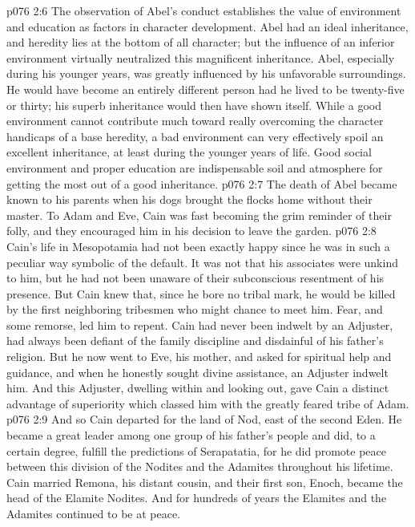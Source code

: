 \vs p076 2:6 \pc The observation of Abel’s conduct establishes the value of environment and education as factors in character development. Abel had an ideal inheritance, and heredity lies at the bottom of all character; but the influence of an inferior environment virtually neutralized this magnificent inheritance. Abel, especially during his younger years, was greatly influenced by his unfavorable surroundings. He would have become an entirely different person had he lived to be twenty\hyp{}five or thirty; his superb inheritance would then have shown itself. While a good environment cannot contribute much toward really overcoming the character handicaps of a base heredity, a bad environment can very effectively spoil an excellent inheritance, at least during the younger years of life. Good social environment and proper education are indispensable soil and atmosphere for getting the most out of a good inheritance.
\vs p076 2:7 \pc The death of Abel became known to his parents when his dogs brought the flocks home without their master. To Adam and Eve, Cain was fast becoming the grim reminder of their folly, and they encouraged him in his decision to leave the garden.
\vs p076 2:8 Cain’s life in Mesopotamia had not been exactly happy since he was in such a peculiar way symbolic of the default. It was not that his associates were unkind to him, but he had not been unaware of their subconscious resentment of his presence. But Cain knew that, since he bore no tribal mark, he would be killed by the first neighboring tribesmen who might chance to meet him. Fear, and some remorse, led him to repent. Cain had never been indwelt by an Adjuster, had always been defiant of the family discipline and disdainful of his father’s religion. But he now went to Eve, his mother, and asked for spiritual help and guidance, and when he honestly sought divine assistance, an Adjuster indwelt him. And this Adjuster, dwelling within and looking out, gave Cain a distinct advantage of superiority which classed him with the greatly feared tribe of Adam.
\vs p076 2:9 And so Cain departed for the land of Nod, east of the second Eden. He became a great leader among one group of his father’s people and did, to a certain degree, fulfill the predictions of Serapatatia, for he did promote peace between this division of the Nodites and the Adamites throughout his lifetime. Cain married Remona, his distant cousin, and their first son, Enoch, became the head of the Elamite Nodites. And for hundreds of years the Elamites and the Adamites continued to be at peace.
